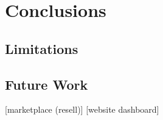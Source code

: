 \chapter{Conclusions}

\section{Limitations}

\section{Future Work}

 [marketplace (resell)]
 [website dashboard]